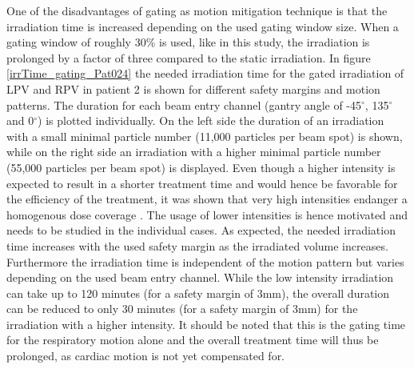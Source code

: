 One of the disadvantages of gating as motion mitigation technique is that the irradiation time is increased depending on the used gating window 
size. When a gating window of roughly 30\% is used, like in this study, the irradiation is prolonged by a factor of three compared to the static 
irradiation. In figure \ref{irrTime_gating_Pat024} the needed irradiation time for the gated irradiation of LPV and RPV in patient 2 is shown for 
different safety margins and motion patterns. The duration for each beam entry channel (gantry angle of -45$^{\circ}$, 135$^{\circ}$ and 0$^{\circ}$) 
is plotted individually. On the left side the duration of an irradiation with a small minimal particle number (11,000 particles per beam spot) 
is shown, while on the right side an irradiation with a higher minimal particle number (55,000 particles per beam spot) is displayed. 
Even though a higher intensity is expected to result in a shorter treatment time and would hence be favorable for the efficiency of the 
treatment, it was shown that very high intensities endanger a homogenous dose coverage \cite{Mue14}. The usage of lower intensities is 
hence motivated and needs to be studied in the individual cases.\newline
\newline
As expected, the needed irradiation time increases with the used safety margin as the irradiated volume increases. Furthermore 
the irradiation time is independent of the motion pattern but varies depending on the used beam entry channel. While the low intensity 
irradiation can take up to 120 minutes (for a safety margin of 3mm), the overall duration can be reduced to only 30 minutes (for a safety 
margin of 3mm) for the irradiation with a higher intensity. It should be noted that this is the gating time for the respiratory motion alone 
and the overall treatment time will thus be prolonged, as cardiac motion is not yet compensated for. 

\vspace*{0.6cm}

